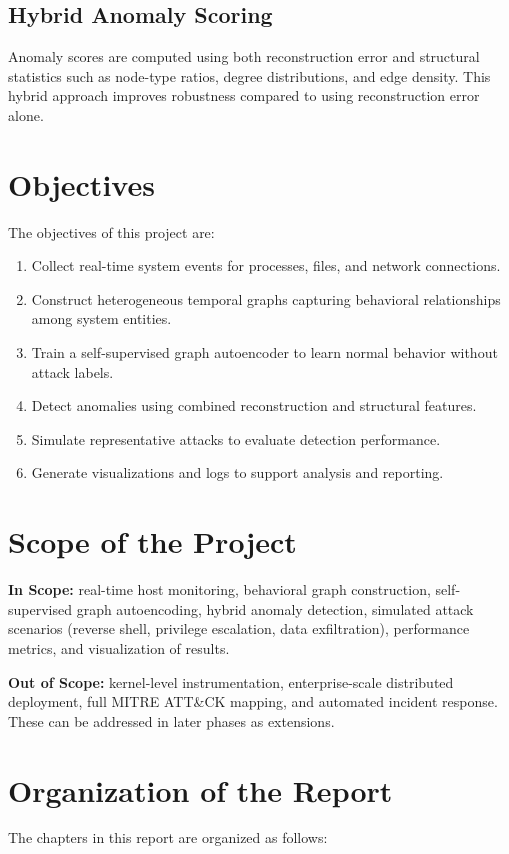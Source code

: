 \subsection{Hybrid Anomaly Scoring}
Anomaly scores are computed using both reconstruction error and structural
statistics such as node-type ratios, degree distributions, and edge density. This
hybrid approach improves robustness compared to using reconstruction error alone.

\section{Objectives}
The objectives of this project are:
\begin{enumerate}
	\item Collect real-time system events for processes, files, and network
	connections.
	\item Construct heterogeneous temporal graphs capturing behavioral
	relationships among system entities.
	\item Train a self-supervised graph autoencoder to learn normal behavior
	without attack labels.
	\item Detect anomalies using combined reconstruction and structural features.
	\item Simulate representative attacks to evaluate detection performance.
	\item Generate visualizations and logs to support analysis and reporting.
\end{enumerate}

\section{Scope of the Project}
\textbf{In Scope:} real-time host monitoring, behavioral graph construction,
self-supervised graph autoencoding, hybrid anomaly detection, simulated attack
scenarios (reverse shell, privilege escalation, data exfiltration), performance
metrics, and visualization of results.

\textbf{Out of Scope:} kernel-level instrumentation, enterprise-scale distributed
deployment, full MITRE ATT\&CK mapping, and automated incident response. These
can be addressed in later phases as extensions.

\section{Organization of the Report}
The chapters in this report are organized as follows:

